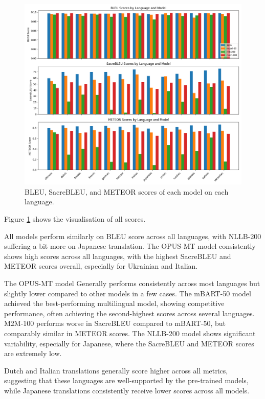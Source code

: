 \documentclass[a4paper]{article}
\begin{document}
\begin{figure}[htbp]
    \centering
    \includegraphics[width=1\linewidth]{figures/metrics_bar.png}
    \caption{BLEU, SacreBLEU, and METEOR scores of each model on each language.}
    \label{fig:result_visual}
\end{figure}

Figure \ref{fig:result_visual} shows the visualisation of all scores.

All models perform similarly on BLEU score across all languages, with NLLB-200 suffering a bit more on Japanese translation. The OPUS-MT model consistently shows high scores across all languages, with the highest SacreBLEU and METEOR scores overall, especially for Ukrainian and Italian.

The OPUS-MT model Generally performs consistently across most languages but slightly lower compared to other models in a few cases.
The mBART-50 model achieved the best-performing multilingual model, showing competitive performance, often achieving the second-highest scores across several languages. M2M-100 performs worse in SacreBLEU compared to mBART-50, but comparably similar in METEOR scores. The NLLB-200 model shows significant variability, especially for Japanese, where the SacreBLEU and METEOR scores are extremely low. 

Dutch and Italian translations generally score higher across all metrics, suggesting that these languages are well-supported by the pre-trained models, while Japanese translations consistently receive lower scores across all models. 
\end{document}
